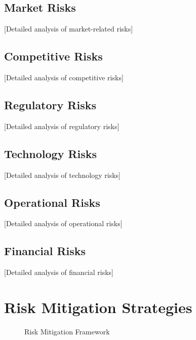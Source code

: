 \documentclass[11pt,letterpaper]{report}
\begin{document}
\subsection{Market Risks}
[Detailed analysis of market-related risks]

\subsection{Competitive Risks}
[Detailed analysis of competitive risks]

\subsection{Regulatory Risks}
[Detailed analysis of regulatory risks]

\subsection{Technology Risks}
[Detailed analysis of technology risks]

\subsection{Operational Risks}
[Detailed analysis of operational risks]

\subsection{Financial Risks}
[Detailed analysis of financial risks]

\section{Risk Mitigation Strategies}


\begin{figure}[htbp]
\centering
\caption{Risk Mitigation Framework}
\label{fig:risk_mitigation}
\end{figure}
\end{document}
